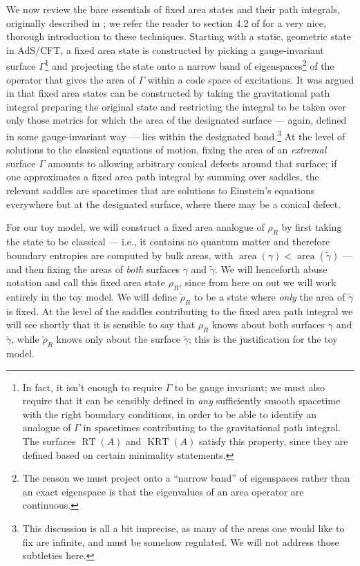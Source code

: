\documentclass[a4paper,11pt]{article}
\renewcommand{\tilde}{\widetilde}
\newcommand{\area}{\operatorname{area}}
\newcommand{\RT}{\operatorname{RT}}
\newcommand{\KRT}{\operatorname{KRT}}
\begin{document}
We now review the bare essentials of fixed area states and their path integrals, originally described in \cite{fixed-area-AR, fixed-area-DHM}; we refer the reader to section 4.2 of \cite{akers-penington} for a very nice, thorough introduction to these techniques. Starting with a static, geometric state in AdS/CFT, a fixed area state is constructed by picking a gauge-invariant surface $\Gamma$\footnote{In fact, it isn't enough to require $\Gamma$ to be gauge invariant; we must also require that it can be sensibly defined in \emph{any} sufficiently smooth spacetime with the right boundary conditions, in order to be able to identify an analogue of $\Gamma$ in spacetimes contributing to the gravitational path integral. The surfaces $\RT(A)$ and $\KRT(A)$ satisfy this property, since they are defined based on certain minimality statements.} and projecting the state onto a narrow band of eigenspaces\footnote{The reason we must project onto a ``narrow band'' of eigenspaces rather than an exact eigenspace is that the eigenvalues of an area operator are continuous.} of the operator that gives the area of $\Gamma$ within a code space of excitations. It was argued in \cite{fixed-area-DHM} that fixed area states can be constructed by taking the gravitational path integral preparing the original state and restricting the integral to be taken over only those metrics for which the area of the designated surface --- again, defined in some gauge-invariant way --- lies within the designated band.\footnote{This discussion is all a bit imprecise, as many of the areas one would like to fix are infinite, and must be somehow regulated. We will not address those subtleties here.} At the level of solutions to the classical equations of motion, fixing the area of an \emph{extremal} surface $\Gamma$ amounts to allowing arbitrary conical defects around that surface; if one approximates a fixed area path integral by summing over saddles, the relevant saddles are spacetimes that are solutions to Einstein's equations everywhere but at the designated surface, where there may be a conical defect.

For our toy model, we will construct a fixed area analogue of $\rho_{R}$ by first taking the state to be classical --- i.e., it contains no quantum matter and therefore boundary entropies are computed by bulk areas, with $\area(\gamma) < \area(\tilde{\gamma})$ --- and then fixing the areas of \emph{both} surfaces $\gamma$ and $\tilde{\gamma}$. We will henceforth abuse notation and call this fixed area state $\rho_{R}$, since from here on out we will work entirely in the toy model. We will define $\tilde{\rho}_{R}$ to be a state where \emph{only} the area of $\tilde{\gamma}$ is fixed. At the level of the saddles contributing to the fixed area path integral we will see shortly that it is sensible to say that $\rho_{R}$ knows about both surfaces $\gamma$ and $\tilde{\gamma}$, while $\tilde{\rho}_{R}$ knows only about the surface $\tilde{\gamma}$; this is the justification for the toy model.
\end{document}
